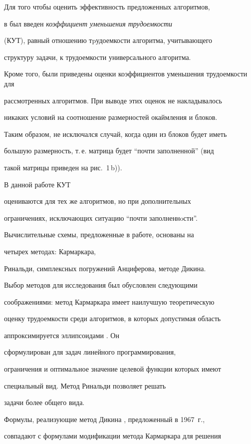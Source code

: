 Для того чтобы оценить эффективность предложенных алгоритмов,


в \cite{Prepr} был введен {\it коэффициент уменьшения трудоемкости}


(КУТ), равный отношению тpудоемкости алгоритма, учитывающего


структуру задачи, к трудоемкости универсального алгоритма.


Кроме того, были приведены оценки коэффициентов уменьшения трудоемкости для


рассмотренных алгоритмов. При выводе этих оценок не накладывалось


никаких условий на соотношение размерностей окаймления и блоков.


Таким образом, не исключался случай, когда один из блоков будет иметь


большую размерность, т.\,е. матрица будет ``почти заполненной'' (вид


такой матрицы приведен на рис.~1\,b)).


В данной работе КУТ


оцениваются для тех же алгоритмов, но при дополнительных


ограничениях, исключающих ситуацию ``почти заполненнoсти''.





Вычислительные схемы, предложенные в работе, основаны на


четырех методах: Кармаркара, 


Ринальди, симплексных погружений Анциферова, методе Дикина.


Выбор методов для исследования был обусловлен следующими


соображениями: метод Кармаркара имеет наилучшую теоретическую


оценку трудоемкости среди алгоритмов, в которых допустимая область


аппроксимируется эллипсоидами \cite{Karmar}. Он


сформулирован для задач линейного программирования,


ограничения и оптимальное значение целевой функции которых имеют


специальный вид. Метод Ринальди \cite{Rin} позволяет решать


задачи более общего вида.


Формулы, реализующие метод Дикина \cite{Dikin}, предложенный в 1967~г.,


совпадают с формулами модификации метода Кармаркара для решения


